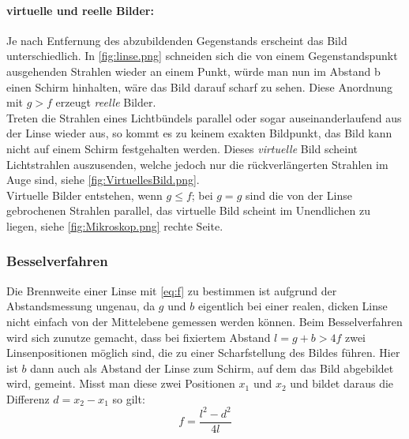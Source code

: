 \paragraph{virtuelle und reelle Bilder:}
Je nach Entfernung des abzubildenden Gegenstands erscheint das Bild unterschiedlich. In \cref{fig:linse.png} schneiden sich die von einem Gegenstandspunkt ausgehenden Strahlen wieder an einem Punkt, würde man nun im Abstand b einen Schirm hinhalten, wäre das Bild darauf scharf zu sehen. Diese Anordnung mit \(g>f\) erzeugt \emph{reelle} Bilder.\\
Treten die Strahlen eines Lichtbündels parallel oder sogar auseinanderlaufend aus der Linse wieder aus, so kommt es zu keinem exakten Bildpunkt, das Bild kann nicht auf einem Schirm festgehalten werden. Dieses \emph{virtuelle} Bild scheint Lichtstrahlen auszusenden, welche jedoch nur die rückverlängerten Strahlen im Auge sind, siehe \cref{fig:VirtuellesBild.png}.\\
Virtuelle Bilder entstehen, wenn \(g\leq f\); bei \(g=g\) sind die von der Linse gebrochenen Strahlen parallel, das virtuelle Bild scheint im Unendlichen zu liegen, siehe \cref{fig:Mikroskop.png} rechte Seite.

\subsubsection{Besselverfahren}
Die Brennweite einer Linse mit \cref{eq:f} zu bestimmen ist aufgrund der Abstandsmessung ungenau, da \(g\) und \(b\) eigentlich bei einer realen, dicken Linse nicht einfach von der Mittelebene gemessen werden können. Beim Besselverfahren wird sich zunutze gemacht, dass bei fixiertem Abstand \(l=g+b > 4f\) zwei Linsenpositionen möglich sind, die zu einer Scharfstellung des Bildes führen. Hier ist \(b\) dann auch als Abstand der Linse zum Schirm, auf dem das Bild abgebildet wird, gemeint. Misst man diese zwei Positionen \(x_1\) und \(x_2\) und bildet daraus die Differenz \(d=x_2-x_1\) so gilt:
\begin{equation}
    f=\frac{l^{2}-d^{2}}{4l}
    \label{eq:Bessel}
\end{equation}

